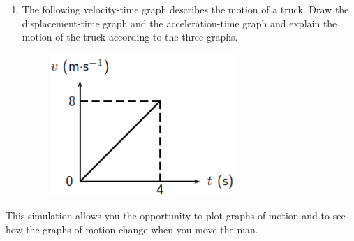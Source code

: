 \begin{enumerate}[noitemsep, label=\textbf{\arabic*}. ]
\begin{figure}[H]
\begin{center}
      \vspace{2pt}
    \vspace{.1in}
    
    \end{center}

 \end{figure}   

    \addtocounter{footnote}{-0}
            \label{m38795*uid120}\item The following velocity-time graph describes the motion of a truck. Draw the displacement-time graph and the acceleration-time graph and explain the motion of the truck according to the three graphs.

    \setcounter{subfigure}{0}


	\begin{figure}[H] %
    \begin{center}
    \label{m38795*id73089!!!underscore!!!media}\label{m38795*id73089!!!underscore!!!printimage}\includegraphics[width=7cm]{col11305.imgs/m38795_PG10C2_028.png} %
        
      \vspace{2pt}
    \vspace{.1in}
    
    \end{center}

 \end{figure}   

    \addtocounter{footnote}{-0}
            \end{enumerate}
        
          
\label{m38795*eip-842}This simulation allows you the opportunity to plot graphs of motion and to see how the graphs of motion change when you move the man.

    \setcounter{subfigure}{0}


